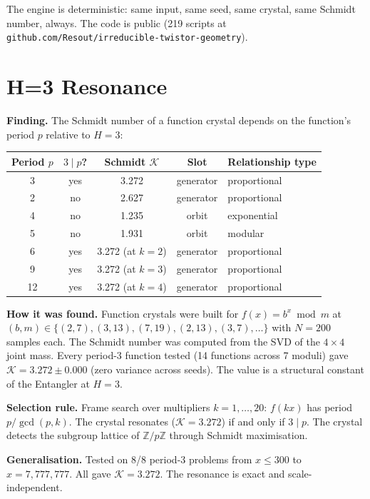 \documentclass[11pt,a4paper]{article}
\theoremstyle{definition}
\theoremstyle{remark}
\newcommand{\Z}{\mathbb{Z}}
\begin{document}
The engine is deterministic: same input, same seed, same crystal, same Schmidt number, always. The code is public (219 scripts at \texttt{github.com/Resout/irreducible-twistor-geometry}).


\section{H=3 Resonance}\label{sec:resonance}

\textbf{Finding.} The Schmidt number of a function crystal depends on the function's period $p$ relative to $H=3$:

\begin{center}
\begin{tabular}{ccccl}
\toprule
Period $p$ & $3 \mid p$? & Schmidt $\mathcal{K}$ & Slot & Relationship type \\
\midrule
3 & yes & 3.272 & generator & proportional \\
2 & no  & 2.627 & generator & proportional \\
4 & no  & 1.235 & orbit & exponential \\
5 & no  & 1.931 & orbit & modular \\
6 & yes & 3.272 (at $k=2$) & generator & proportional \\
9 & yes & 3.272 (at $k=3$) & generator & proportional \\
12 & yes & 3.272 (at $k=4$) & generator & proportional \\
\bottomrule
\end{tabular}
\end{center}

\textbf{How it was found.} Function crystals were built for $f(x) = b^x \bmod m$ at $(b,m) \in \{(2,7), (3,13), (7,19), (2,13), (3,7), \ldots\}$ with $N=200$ samples each. The Schmidt number was computed from the SVD of the $4\times 4$ joint mass. Every period-$3$ function tested (14 functions across 7 moduli) gave $\mathcal{K} = 3.272 \pm 0.000$ (zero variance across seeds). The value is a structural constant of the Entangler at $H=3$.

\textbf{Selection rule.} Frame search over multipliers $k=1,\ldots,20$: $f(kx)$ has period $p/\gcd(p,k)$. The crystal resonates ($\mathcal{K} = 3.272$) if and only if $3 \mid p$. The crystal detects the subgroup lattice of $\Z/p\Z$ through Schmidt maximisation.

\textbf{Generalisation.} Tested on 8/8 period-$3$ problems from $x \leq 300$ to $x = 7{,}777{,}777$. All gave $\mathcal{K} = 3.272$. The resonance is exact and scale-independent.
\end{document}
